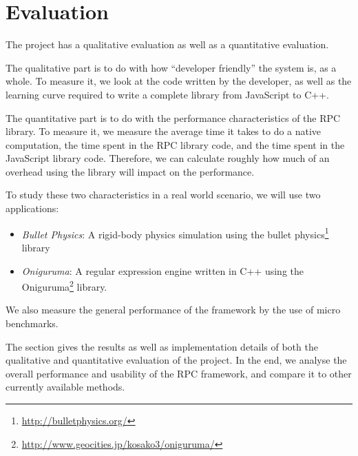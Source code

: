 \chapter{Evaluation}
\label{Chapter6}

The project has a qualitative evaluation as well as a quantitative evaluation.

The qualitative part is to do with how ``developer friendly'' the system is, as a whole. To measure it, we look at the code written by the developer, as well as the learning curve required to write a complete library from JavaScript to C++.

The quantitative part is to do with the performance characteristics of the RPC library. To measure it, we measure the average time it takes to do a native computation, the time spent in the RPC library code, and the time spent in the JavaScript library code. Therefore, we can calculate roughly how much of an overhead using the library will impact on the performance.

To study these two characteristics in a real world scenario, we will use two applications:

\begin{itemize}
	\item \emph{Bullet Physics}: A rigid-body physics simulation using the bullet physics\footnote{\url{http://bulletphysics.org/}} library
	\item \emph{Oniguruma}: A regular expression engine written in C++ using the Oniguruma\footnote{\url{http://www.geocities.jp/kosako3/oniguruma/}} library.
\end{itemize}

We also measure the general performance of the framework by the use of micro benchmarks.

The section gives the results as well as implementation details of both the qualitative and quantitative evaluation of the project. In the end, we analyse the overall performance and usability of the RPC framework, and compare it to other currently available methods.


\newpage


\newpage